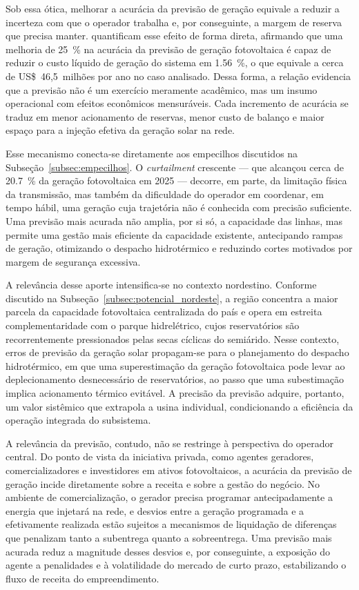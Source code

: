 Sob essa ótica, melhorar a acurácia da previsão de geração equivale a reduzir a
incerteza com que o operador trabalha e, por conseguinte, a margem de reserva que
precisa manter.  quantificam esse efeito de forma direta, afirmando que
uma melhoria de \SI{25}{\percent} na acurácia da previsão de geração fotovoltaica
é capaz de reduzir o custo líquido de geração do sistema em \SI{1,56}{\percent},
o que equivale a cerca de US\$~46,5~milhões por ano no caso analisado. Dessa forma, a relação
evidencia que a previsão não é um exercício meramente acadêmico, mas um insumo
operacional com efeitos econômicos mensuráveis. Cada incremento de acurácia se
traduz em menor acionamento de reservas, menor custo de balanço e maior espaço
para a injeção efetiva da geração solar na rede.

Esse mecanismo conecta-se diretamente aos empecilhos discutidos na
Subseção~\ref{subsec:empecilhos}. O \textit{curtailment} crescente --- que
alcançou cerca de \SI{20,7}{\percent} da geração fotovoltaica em 2025
\cite{absolar2026infografico} --- decorre, em parte, da limitação física da
transmissão, mas também da dificuldade do operador em coordenar, em tempo hábil,
uma geração cuja trajetória não é conhecida com precisão suficiente. Uma previsão
mais acurada não amplia, por si só, a capacidade das linhas, mas permite uma
gestão mais eficiente da capacidade existente, antecipando rampas de geração,
otimizando o despacho hidrotérmico e reduzindo cortes motivados por margem de
segurança excessiva. 

A relevância desse aporte intensifica-se no contexto nordestino. Conforme
discutido na Subseção~\ref{subsec:potencial_nordeste}, a região concentra a maior
parcela da capacidade fotovoltaica centralizada do país e opera em estreita
complementaridade com o parque hidrelétrico, cujos reservatórios são recorrentemente
pressionados pelas secas cíclicas do semiárido. Nesse contexto, erros de previsão
da geração solar propagam-se para o planejamento do despacho hidrotérmico, em que uma
superestimação da geração fotovoltaica pode levar ao deplecionamento desnecessário
de reservatórios, ao passo que uma subestimação implica acionamento térmico
evitável. A precisão da previsão adquire, portanto, um valor sistêmico que extrapola
a usina individual, condicionando a eficiência da operação integrada do
subsistema.

A relevância da previsão, contudo, não se restringe à perspectiva do operador
central. Do ponto de vista da iniciativa privada, como agentes geradores,
comercializadores e investidores em ativos fotovoltaicos, a acurácia da
previsão de geração incide diretamente sobre a receita e sobre a gestão do
negócio. No ambiente de comercialização, o gerador precisa programar
antecipadamente a energia que injetará na rede, e desvios entre a geração
programada e a efetivamente realizada estão sujeitos a mecanismos de liquidação
de diferenças que penalizam tanto a subentrega quanto a sobreentrega. Uma
previsão mais acurada reduz a magnitude desses desvios e, por conseguinte, a
exposição do agente a penalidades e à volatilidade do mercado de curto prazo,
estabilizando o fluxo de receita do empreendimento.

